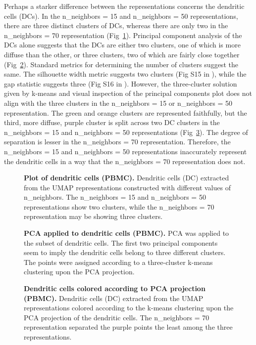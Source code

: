 \documentclass[10pt,letterpaper]{article}
\begin{document}
Perhaps a starker difference between the representations concerns the dendritic cells (DCs). In the n\_neighbors = 15 and n\_neighbors = 50 representations, there are three distinct clusters of DCs, whereas there are only two in the n\_neighbors = 70 representation (Fig~\ref{fig18}). Principal component analysis of the DCs alone suggests that the DCs are either two clusters, one of which is more diffuse than the other, or three clusters, two of which are fairly close together (Fig~\ref{fig19}). Standard metrics for determining the number of clusters suggest the same. The silhouette width metric suggests two clusters (Fig S15 in ), while the gap statistic suggests three (Fig S16 in ). However, the three-cluster solution given by k-means and visual inspection of the principal components plot does not align with the three clusters in the n\_neighbors = 15 or n\_neighbors = 50 representation. The green and orange clusters are represented faithfully, but the third, more diffuse, purple cluster is split across two DC clusters in the n\_neighbors = 15 and n\_neighbors = 50 representations (Fig~\ref{fig20}). The degree of separation is lesser in the n\_neighbors = 70 representation. Therefore, the n\_neighbors = 15 and n\_neighbors = 50 representations inaccurately represent the dendritic cells in a way that the n\_neighbors = 70 representation does not.

\begin{figure}[!h]
\caption{{\bf Plot of dendritic cells (PBMC).}
Dendritic cells (DC) extracted from the UMAP representations constructed with different values of n\_neighbors. The n\_neighbors = 15 and n\_neighbors = 50 representations show two clusters, while the n\_neighbors = 70 representation may be showing three clusters.}
\label{fig18}
\end{figure}

\begin{figure}[!h]
\caption{{\bf PCA applied to dendritic cells (PBMC).}
PCA was applied to the subset of dendritic cells. The first two principal components seem to imply the dendritic cells belong to three different clusters. The points were assigned according to a three-cluster k-means clustering upon the PCA projection. }
\label{fig19}
\end{figure}

\begin{figure}[!h]
\caption{{\bf Dendritic cells colored according to PCA projection (PBMC).}
Dendritic cells (DC) extracted from the UMAP representations colored according to the k-means clustering upon the PCA projection of the dendritic cells. The n\_neighbors = 70 representation separated the purple points the least among the three representations.}
\label{fig20}
\end{figure}
\end{document}
